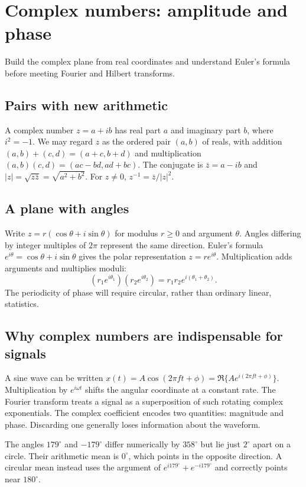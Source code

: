 \chapter{Complex numbers: amplitude and phase}\label{ch:complex}
\begin{readergoal}Build the complex plane from real coordinates and understand Euler's formula before meeting Fourier and Hilbert transforms.\end{readergoal}
\section{Pairs with new arithmetic}
A complex number $z=a+ib$ has real part $a$ and imaginary part $b$, where $i^2=-1$. We may regard $z$ as the ordered pair $(a,b)$ of reals, with addition $(a,b)+(c,d)=(a+c,b+d)$ and multiplication $(a,b)(c,d)=(ac-bd,ad+bc)$. The conjugate is $\bar z=a-ib$ and $|z|=\sqrt{z\bar z}=\sqrt{a^2+b^2}$. For $z\ne0$, $z^{-1}=\bar z/|z|^2$.

\section{A plane with angles}
Write $z=r(\cos\theta+i\sin\theta)$ for modulus $r\ge0$ and argument $\theta$. Angles differing by integer multiples of $2\pi$ represent the same direction. Euler's formula $e^{i\theta}=\cos\theta+i\sin\theta$ gives the polar representation $z=re^{i\theta}$. Multiplication adds arguments and multiplies moduli:
\[(r_1e^{i\theta_1})(r_2e^{i\theta_2})=r_1r_2e^{i(\theta_1+\theta_2)}.\]
The periodicity of phase will require circular, rather than ordinary linear, statistics.

\section{Why complex numbers are indispensable for signals}
A sine wave can be written $x(t)=A\cos(2\pi ft+\phi)=\Re\{Ae^{i(2\pi ft+\phi)}\}$. Multiplication by $e^{i\omega t}$ shifts the angular coordinate at a constant rate. The Fourier transform treats a signal as a superposition of such rotating complex exponentials. The complex coefficient encodes two quantities: magnitude and phase. Discarding one generally loses information about the waveform.

\begin{workedexample}
The angles $179^\circ$ and $-179^\circ$ differ numerically by $358^\circ$ but lie just $2^\circ$ apart on a circle. Their arithmetic mean is $0^\circ$, which points in the opposite direction. A circular mean instead uses the argument of $e^{i179^\circ}+e^{-i179^\circ}$ and correctly points near $180^\circ$.
\end{workedexample}
